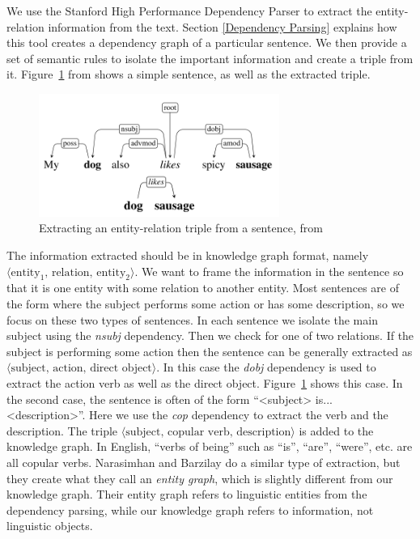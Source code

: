 \documentclass[pageno]{jpaper}
\begin{document}
We use the Stanford High Performance Dependency Parser \cite{Chen2014} to
extract the entity-relation information from the text. Section \ref{Dependency
Parsing} explains how this tool creates a dependency graph of a particular
sentence. We then provide a set of semantic rules to isolate the important
information and create a triple from it. Figure~\ref{fig: dependency extraction}
from \cite{Narasimhan2015} shows a simple sentence, as well as the extracted
triple.

\begin{figure}[!tb]
    \centering
    \includegraphics[width=0.7\textwidth,keepaspectratio]{figures/Dependency_Extraction.png}
    \caption{Extracting an entity-relation triple from a sentence, from \cite{Narasimhan2015}}
    \label{fig: dependency extraction}
\end{figure}

The information extracted should be in knowledge graph format, namely $\langle
\text{entity}_1, \,\text{relation}, \,\text{entity}_2 \rangle$. We want to frame
the information in the sentence so that it is one entity with some relation to
another entity. Most sentences are of the form where the subject performs some
action or has some description, so we focus on these two types of sentences. In
each sentence we isolate the main subject using the \textit{nsubj} dependency.
Then we check for one of two relations. If the subject is performing some action
then the sentence can be generally extracted as $\langle \text{subject},
\,\text{action}, \,\text{direct object} \rangle$. In this case the \textit{dobj}
dependency is used to extract the action verb as well as the direct object.
Figure~\ref{fig: dependency extraction} shows this case. In the second case, the
sentence is often of the form ``<subject> is... <description>''. Here we use the
\textit{cop} dependency to extract the verb and the description. The triple
$\langle \text{subject}, \,\text{copular verb}, \,\text{description} \rangle$ is
added to the knowledge graph. In English, ``verbs of being'' such as ``is'',
``are'', ``were'', etc. are all copular verbs. Narasimhan and Barzilay
\cite{Narasimhan2015} do a similar type of extraction, but they create what they
call an \textit{entity graph}, which is slightly different from our knowledge
graph. Their entity graph refers to linguistic entities from the dependency
parsing, while our knowledge graph refers to information, not linguistic
objects.
\end{document}
